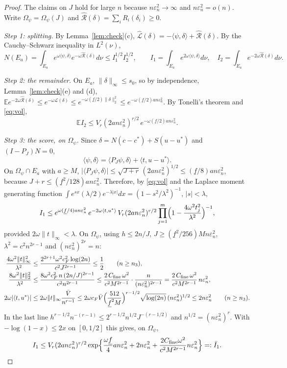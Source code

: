 \documentclass[11pt]{article}
\theoremstyle{definition}
\theoremstyle{remark}
\newcommand{\E}{\mathbb{E}}
\newcommand{\om}{\omega}
\newcommand{\en}{\varepsilon_n}
\newcommand{\Lh}{\widehat{\mathcal L}}
\newcommand{\Lm}{\mathcal L}
\newcommand{\Rh}{\widehat{\mathcal R}}
\newcommand{\fl}{\underline f}
\newcommand{\Vb}{\bar V}
\begin{document}
\begin{proof}
The claims on $J$ hold for large $n$ because $n\en^2\to\infty$ and $n\en^2=o(n)$. Write $\Omega_\psi=\Omega_\psi(J)$ and $\Rh(\delta)=\sum_iR_i(\delta_i)\ge0$.

\emph{Step 1: splitting.} By Lemma~\ref{lem:check}(c), $\Lh(\delta)=-\langle\psi,\delta\rangle+\Rh(\delta)$. By the Cauchy--Schwarz inequality in $L^2(\nu)$,
\[
N(E_a)=\int_{E_a}e^{\om\langle\psi,\delta\rangle}e^{-\om\Rh(\delta)}d\nu\le I_1^{1/2}I_2^{1/2},\qquad I_1=\int_{E_a}e^{2\om\langle\psi,\delta\rangle}d\nu,\quad I_2=\int_{E_a}e^{-2\om\Rh(\delta)}d\nu .
\]

\emph{Step 2: the remainder.} On $E_a$, $\|\delta\|_\infty\le s_0$, so by independence, Lemma~\ref{lem:check}(e) and (d), $\E e^{-2\om\Rh(\delta)}\le e^{-\om\Lm(\delta)}\le e^{-\om(\fl/2)\|\delta\|_2^2}\le e^{-\om(\fl/2)an\en^2}$. By Tonelli's theorem and \eqref{eq:vol},
\begin{equation}\label{eq:I2}
\E I_2\le V_r(2an\en^2)^{r/2}\,e^{-\om(\fl/2)an\en^2}.
\end{equation}

\emph{Step 3: the score, on $\Omega_\psi$.} Since $\delta=N(c-c^{*})+S(u-u^{*})$ and $(I-P_J)N=0$,
\[
\langle\psi,\delta\rangle=\langle P_J\psi,\delta\rangle+\langle t,u-u^{*}\rangle .
\]
On $\Omega_\psi\cap E_a$ with $a\ge M$, $|\langle P_J\psi,\delta\rangle|\le\sqrt{J+r}\,(2an\en^2)^{1/2}\le(\fl/8)an\en^2$, because $J+r\le(\fl^2/128)an\en^2$. Therefore, by \eqref{eq:vol} and the Laplace moment generating function $\int e^{sx}(\lambda/2)e^{-\lambda|x|}dx=(1-s^2/\lambda^2)^{-1}$, $|s|<\lambda$,
\[
I_1\le e^{\om(\fl/4)an\en^2}\,e^{-2\om\langle t,u^{*}\rangle}\,V_r(2an\en^2)^{r/2}\prod_{j=1}^m\Bigl(1-\frac{4\om^2t_j^2}{\lambda^2}\Bigr)^{-1},
\]
provided $2\om\|t\|_\infty<\lambda$. On $\Omega_\psi$, using $h\le2n/J$, $J\ge(\fl^2/256)Mn\en^2$, $\lambda^2=c^2n^{2r-1}$ and $(n\en^2)^{2r}=n$:
\begin{align*}
\frac{4\om^2\|t\|_\infty^2}{\lambda^2}&\le\frac{2^{2r+1}\om^2c_F^2\log(2n)}{c^2J^{2r-1}}\le\frac12\qquad(n\ge n_3),\\
\frac{8\om^2\|t\|_2^2}{\lambda^2}&\le\frac{8\om^2c_F^2\,n\,(2n/J)^{2r-1}}{c^2n^{2r-1}}\le\frac{2\,C_{\rm fine}\,\om^2}{c^2M^{2r-1}}\cdot\frac{n}{(n\en^2)^{2r-1}}=\frac{2\,C_{\rm fine}\,\om^2}{c^2M^{2r-1}}\,n\en^2,\\
2\om|\langle t,u^{*}\rangle|&\le2\om\|t\|_\infty\frac{\Vb}{n^{r-1}}\le2\om c_F\Vb\Bigl(\frac{512}{\fl^2M}\Bigr)^{r-1/2}\sqrt{\log(2n)}\,(n\en^2)^{1/2}\le2n\en^2\qquad(n\ge n_3).
\end{align*}
In the last line $h^{r-1/2}n^{-(r-1)}\le2^{r-1/2}n^{1/2}J^{-(r-1/2)}$ and $n^{1/2}=(n\en^2)^{r}$. With $-\log(1-x)\le2x$ on $[0,1/2]$ this gives, on $\Omega_\psi$,
\begin{equation}\label{eq:I1}
I_1\le V_r(2an\en^2)^{r/2}\exp\Bigl\{\frac{\om\fl}{4}an\en^2+2n\en^2+\frac{2C_{\rm fine}\om^2}{c^2M^{2r-1}}n\en^2\Bigr\}=:\bar I_1 .
\end{equation}


\end{proof}
\end{document}
